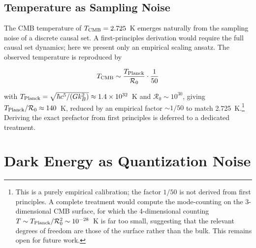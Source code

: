 \documentclass[12pt]{article}
\begin{document}
\subsection{Temperature as Sampling Noise}
\label{sec:temp}

The CMB temperature of $T_{\rm CMB} = 2.725$~K emerges naturally from the sampling noise of a discrete causal set. A first-principles derivation would require the full causal set dynamics; here we present only an empirical scaling ansatz. The observed temperature is reproduced by

\begin{equation}
T_{\rm CMB} \sim \frac{T_{\rm Planck}}{\mathcal{R}_0} \cdot \frac{1}{50}
\label{eq:cmb-ansatz}
\end{equation}

with $T_{\rm Planck} = \sqrt{\hbar c^5 / (G k_B^2)} \approx 1.4\times10^{32}$~K and $\mathcal{R}_0 \sim 10^{30}$, giving $T_{\rm Planck}/\mathcal{R}_0 \approx 140$~K, reduced by an empirical factor $\sim 1/50$ to match 2.725~K.\footnote{This is a purely empirical calibration; the factor $1/50$ is not derived from first principles. A complete treatment would compute the mode-counting on the 3-dimensional CMB surface, for which the 4-dimensional counting $T \sim T_{\rm Planck}/\mathcal{R}_0^2 \sim 10^{-28}$~K is far too small, suggesting that the relevant degrees of freedom are those of the surface rather than the bulk. This remains open for future work.} Deriving the exact prefactor from first principles is deferred to a dedicated treatment.

\section{Dark Energy as Quantization Noise}
\label{sec:de}
\end{document}
